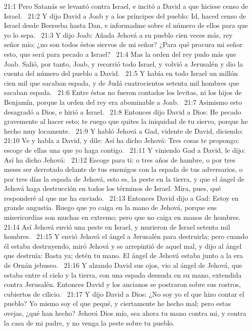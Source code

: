 21:1 Pero Satanás se levantó contra Israel, e incitó a David a que hiciese censo de Israel.  
21:2 Y dijo David a Joab y a los príncipes del pueblo: Id, haced censo de Israel desde Beerseba hasta Dan, e informadme sobre el número de ellos para que yo lo sepa.  
21:3 Y dijo Joab: Añada Jehová a su pueblo cien veces más, rey señor mío; ¿no son todos éstos siervos de mi señor? ¿Para qué procura mi señor esto, que será para pecado a Israel?  
21:4 Mas la orden del rey pudo más que Joab. Salió, por tanto, Joab, y recorrió todo Israel, y volvió a Jerusalén y dio la cuenta del número del pueblo a David.  
21:5 Y había en todo Israel un millón cien mil que sacaban espada, y de Judá cuatrocientos setenta mil hombres que sacaban espada.  
21:6 Entre éstos no fueron contados los levitas, ni los hijos de Benjamín, porque la orden del rey era abominable a Joab.  
21:7 Asimismo esto desagradó a Dios, e hirió a Israel.  
21:8 Entonces dijo David a Dios: He pecado gravemente al hacer esto; te ruego que quites la iniquidad de tu siervo, porque he hecho muy locamente.  
21:9 Y habló Jehová a Gad, vidente de David, diciendo:  
21:10 Ve y habla a David, y dile: Así ha dicho Jehová: Tres cosas te propongo; escoge de ellas una que yo haga contigo.  
21:11 Y viniendo Gad a David, le dijo: Así ha dicho Jehová:  
21:12 Escoge para ti: o tres años de hambre, o por tres meses ser derrotado delante de tus enemigos con la espada de tus adversarios, o por tres días la espada de Jehová, esto es, la peste en la tierra, y que el ángel de Jehová haga destrucción en todos los términos de Israel. Mira, pues, qué responderé al que me ha enviado.  
21:13 Entonces David dijo a Gad: Estoy en grande angustia. Ruego que yo caiga en la mano de Jehová, porque sus misericordias son muchas en extremo; pero que no caiga en manos de hombres.  
21:14 Así Jehová envió una peste en Israel, y murieron de Israel setenta mil hombres.  
21:15 Y envió Jehová el ángel a Jerusalén para destruirla; pero cuando él estaba destruyendo, miró Jehová y se arrepintió de aquel mal, y dijo al ángel que destruía: Basta ya; detén tu mano. El ángel de Jehová estaba junto a la era de Ornán jebuseo.  
21:16 Y alzando David sus ojos, vio al ángel de Jehová, que estaba entre el cielo y la tierra, con una espada desnuda en su mano, extendida contra Jerusalén. Entonces David y los ancianos se postraron sobre sus rostros, cubiertos de cilicio.  
21:17 Y dijo David a Dios: ¿No soy yo el que hizo contar el pueblo? Yo mismo soy el que pequé, y ciertamente he hecho mal; pero estas ovejas, ¿qué han hecho? Jehová Dios mío, sea ahora tu mano contra mi, y contra la casa de mi padre, y no venga la peste sobre tu pueblo.  
